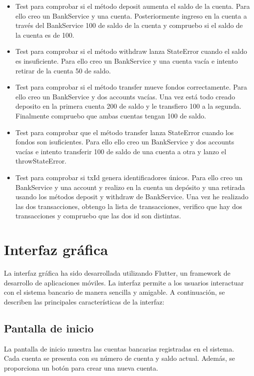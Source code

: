 \documentclass[12pt]{article}
\begin{document}
\begin{itemize}
\begin{itemize}
              \item Test para comprobar si el método deposit aumenta el saldo de la cuenta. Para ello creo un BankService y una cuenta. Posteriormente ingreso en la cuenta a través del BankService 100 de saldo de la cuenta y compruebo si el saldo de la cuenta es de 100.
              \item Test para comprobar si el método withdraw lanza StateError cuando el saldo es insuficiente.
                    Para ello creo un BankService y una cuenta vacía e intento retirar de la cuenta 50 de saldo.
              \item Test para comprobar si el método transfer mueve fondos correctamente. Para ello creo un BankService y dos accounts vacías. Una vez está todo creado deposito en la primera cuenta 200 de saldo y le transfiero 100 a la segunda. Finalmente compruebo que ambas cuentas tengan 100 de saldo.
              \item Test para comprobar que el método transfer lanza StateError cuando los fondos son isuficientes. Para ello ello creo un BankService y dos accounts vacías e intento transferir 100 de saldo de una cuenta a otra y lanzo el throwStateError.
              \item Test para comprobar si txId genera identificadores únicos. Para ello creo un BankService y una account y realizo en la cuenta un depósito y una retirada usando los métodos deposit y withdraw de BankService. Una vez he realizado las dos transacciones, obtengo la lista de transacciones, verifico que hay dos transacciones y compruebo que las dos id son distintas.
          \end{itemize}
\end{itemize}

\section*{Interfaz gráfica}

La interfaz gráfica ha sido desarrollada utilizando Flutter, un framework de desarrollo de aplicaciones móviles. La interfaz permite a los usuarios interactuar con el sistema bancario de manera sencilla y amigable. A continuación, se describen las principales características de la interfaz:

\subsection*{Pantalla de inicio}

La pantalla de inicio muestra las cuentas bancarias registradas en el sistema. Cada cuenta se presenta con su número de cuenta y saldo actual. Además, se proporciona un botón para crear una nueva cuenta.
\end{document}
